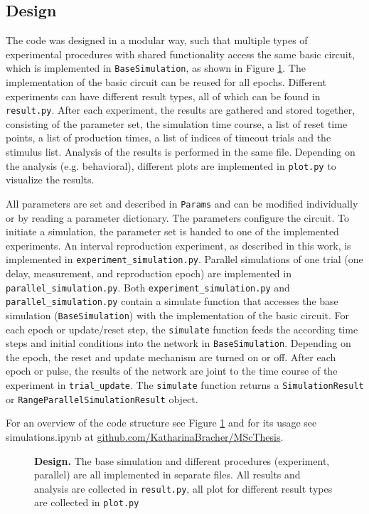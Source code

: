 \documentclass[10pt, a4paper]{article}
\begin{document}
\subsection*{Design}
The code was designed in a modular way, such that multiple types of experimental procedures with shared functionality access the same basic circuit, which is implemented in \texttt{BaseSimulation}, as shown in Figure \ref{fig:code}.
The implementation of the basic circuit can be reused for all epochs.
Different experiments can have different result types, all of which can be found in \texttt{result.py}. After each experiment, the results are gathered and stored together, consisting of the parameter set, the simulation time course, a list of reset time points, a list of production times, a list of indices of timeout trials and the stimulus list.
Analysis of the results is performed in the same file. Depending on the analysis (e.g. behavioral), different plots are implemented in \texttt{plot.py} to visualize the results. 

All parameters are set and described in \texttt{Params} and can be modified individually or by reading a parameter dictionary. The parameters configure the circuit. 
To initiate a simulation, the parameter set is handed to one of the implemented experiments. 
An interval reproduction experiment, as described in this work, is implemented in \texttt{experiment\_simulation.py}. 
Parallel simulations of one trial (one delay, measurement, and reproduction epoch) are implemented in \texttt{parallel\_simulation.py}.
Both \texttt{experiment\_simulation.py} and \texttt{parallel\_simulation.py} contain a simulate function that accesses the base simulation (\texttt{BaseSimulation}) with the implementation of the basic circuit.
For each epoch or update/reset step, the \texttt{simulate} function feeds the according time steps and initial conditions into the network in \texttt{BaseSimulation}. Depending on the epoch, the reset and update mechanism are turned on or off. 
After each epoch or pulse, the results of the network are joint to the time course of the experiment in \texttt{trial\_update}. The \texttt{simulate} function returns a \texttt{SimulationResult} or \texttt{RangeParallelSimulationResult} object.

For an overview of the code structure see Figure \ref{fig:code} and for its usage see simulations.ipynb at \href{https://github.com/KatharinaBracher/MScThesis}{github.com/KatharinaBracher/MScThesis}.


\begin{figure}[ht]
	\vspace*{-2cm}
	\caption{\textbf{Design.} The base simulation and different procedures (experiment, parallel) are all implemented in separate files. All results and analysis are collected in \texttt{result.py}, all plot for different result types are collected in \texttt{plot.py}}
\label{fig:code}
\end{figure}


\clearpage
{}
\printbibliography
\end{document}
